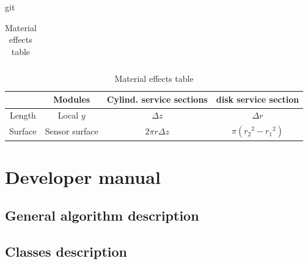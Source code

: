 git\documentclass[12pt, a4paper]{article}
\begin{document}
\begin{landscape}
\begin{table}[hbtp]
\begin{minipage}{\textwidth}
\begin{savenotes}
\begin{center}
\begin{tabular}{|c||c|c|c|}
            \hline
          \end{tabular}
        \end{center}
        \begin{center}
          \tiny
          \begin{tabular}{|c|c|c|c|}
            \hline
            & Modules & Cylind. service sections & disk service section \\
            \hline
            Length & Local $y$ & $\Delta z$ & $\Delta r$ \\
            \hline
            Surface & Sensor surface & $2\pi r \Delta z$ & $\pi({r_2}^2 - {r_1}^2)$ \\
            \hline
          \end{tabular}
        \end{center}
      \end{savenotes}
    \end{minipage}
    \caption{Material effects table}
    \label{tab:materialEffect}
  \end{table}
\end{landscape}

\section{Developer manual}\label{sec:developerManual}

\subsection{General algorithm description}

\subsection{Classes description}
\end{document}
